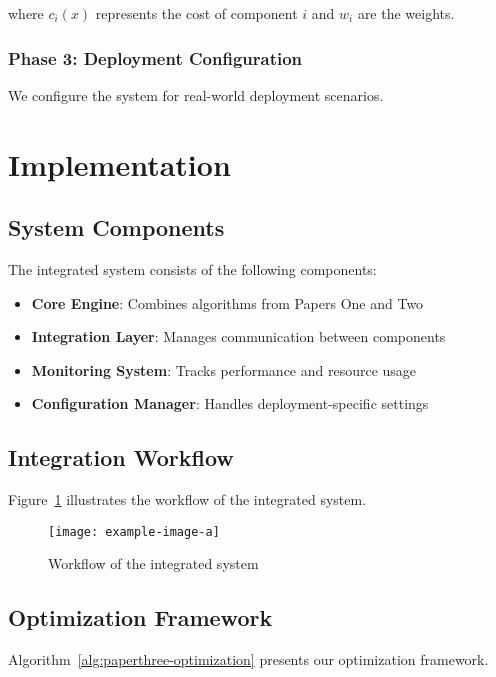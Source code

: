 where $c_i(x)$ represents the cost of component $i$ and $w_i$ are the weights.

\subsubsection{Phase 3: Deployment Configuration}
We configure the system for real-world deployment scenarios.

\section{Implementation}

\subsection{System Components}

The integrated system consists of the following components:
\begin{itemize}
    \item \textbf{Core Engine}: Combines algorithms from Papers One and Two
    \item \textbf{Integration Layer}: Manages communication between components
    \item \textbf{Monitoring System}: Tracks performance and resource usage
    \item \textbf{Configuration Manager}: Handles deployment-specific settings
\end{itemize}

\subsection{Integration Workflow}

Figure~\ref{fig:paperthree-workflow} illustrates the workflow of the integrated system.

\begin{figure}[!htb]
    \centering
    \texttt{[image: example-image-a]}
    \caption{Workflow of the integrated system}
    \label{fig:paperthree-workflow}
\end{figure}

\subsection{Optimization Framework}

Algorithm~\ref{alg:paperthree-optimization} presents our optimization framework.

